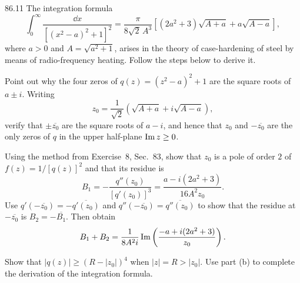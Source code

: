 \documentclass[11pt,oneside]{article}
\begin{document}
\begin{exercise}{86.11}
The integration formula
\[
    \int_0^\infty\frac{\dd x}{[(x^2-a)^2+1]^2}
    =\frac{\pi}{8\sqrt2\,A^3}
      \left[(2a^2+3)\sqrt{A+a}+a\sqrt{A-a}\right],
\]
where $a>0$ and $A=\sqrt{a^2+1}$, arises in the theory of case-hardening of steel by means of radio-frequency heating. Follow the steps below to derive it.
\begin{exercisesubparts}
    \item Point out why the four zeros of $q(z)=(z^2-a)^2+1$ are the square roots of $a\pm i$. Writing
    \[
        z_0=\frac1{\sqrt2}\left(\sqrt{A+a}+i\sqrt{A-a}\right),
    \]
    verify that $\pm\overline{z_0}$ are the square roots of $a-i$, and hence that $z_0$ and $-\overline{z_0}$ are the only zeros of $q$ in the upper half-plane $\operatorname{Im} z\ge0$.

    \item Using the method from Exercise~8, Sec.~83, show that $z_0$ is a pole of order $2$ of $f(z)=1/[q(z)]^2$ and that its residue is
    \[
        B_1=-\frac{q''(z_0)}{[q'(z_0)]^3}
        =\frac{a-i(2a^2+3)}{16A^2z_0}.
    \]
    Use $q'(-\overline{z_0})=-\overline{q'(z_0)}$ and $q''(-\overline{z_0})=\overline{q''(z_0)}$ to show that the residue at $-\overline{z_0}$ is $B_2=-\overline{B_1}$. Then obtain
    \[
        B_1+B_2=\frac1{8A^2i}\operatorname{Im}\left(\frac{-a+i(2a^2+3)}{z_0}\right).
    \]

    \item Show that $|q(z)|\ge(R-|z_0|)^4$ when $|z|=R>|z_0|$. Use part (b) to complete the derivation of the integration formula.
\end{exercisesubparts}
\end{exercise}
\end{document}
